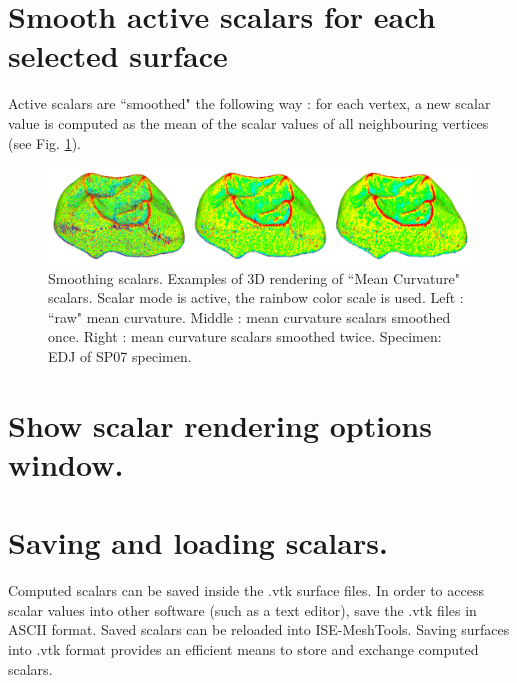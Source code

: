 \section{Smooth active scalars for each selected surface}
Active scalars are ``smoothed" the following way : for each vertex, a new scalar value is computed as
the mean of the scalar values of all neighbouring vertices (see Fig. \ref{smoothing_scalars}).
\begin{figure}
  \centering
  \includegraphics[scale=0.25]{images/Scalars_renreding/Smooth_012.png} 
	\caption{Smoothing scalars. Examples of 3D rendering of ``Mean Curvature" scalars. Scalar mode is active, the rainbow color scale is used. Left : ``raw" mean curvature. Middle : mean curvature scalars smoothed once. Right : mean curvature scalars smoothed twice. Specimen: EDJ of SP07 specimen.}
\label{smoothing_scalars}
 
\end{figure}




\section{Show scalar rendering options window.}





















\section{Saving and loading scalars.}
Computed scalars can be saved inside the .vtk surface files. In order to access scalar values into other software (such as a text editor), save the .vtk files in ASCII format. Saved scalars can be reloaded into ISE-MeshTools. Saving surfaces into .vtk format provides an efficient means to store and exchange
computed scalars.

